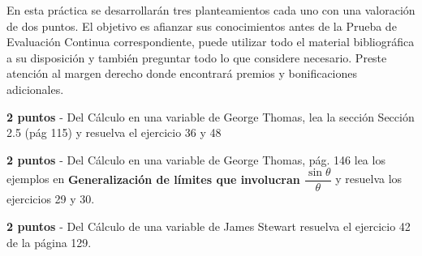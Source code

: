 \documentclass[a4 paper]{article}
\begin{document}

En esta práctica se desarrollarán tres planteamientos cada uno con una valoración de dos puntos. El objetivo es afianzar sus conocimientos antes de la Prueba de Evaluación Continua correspondiente, puede utilizar todo el material bibliográfica a su disposición y también preguntar todo lo que considere necesario. Preste atención al margen derecho donde encontrará premios y bonificaciones adicionales.

\vspace{5mm}

 \textbf{2 puntos} - Del Cálculo en una variable de George Thomas, lea la sección Sección 2.5 (pág 115) y resuelva el ejercicio 36 y 48
\vskip 3mm
\solution{} 
\vspace{30mm}

 \textbf{2 puntos} - Del Cálculo en una variable de George Thomas, pág. 146 lea los ejemplos en \textbf{Generalización de límites que involucran $\dfrac{\sin \theta}{\theta}$} y resuelva los ejercicios 29 y 30.
\vskip 3mm
\solution{}
\vspace{30mm}

 \textbf{2 puntos} - Del Cálculo de una variable de James Stewart resuelva el ejercicio 42 de la página 129.
\vskip 3mm
\solution{}
\vspace{30mm}
\end{document}
